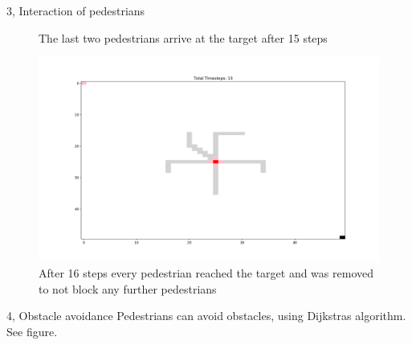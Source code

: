 \documentclass[10pt,a4paper]{article}
\begin{document}
\begin{task}{3, Interaction of pedestrians}
\begin{figure}
    \caption{The last two pedestrians arrive at the target after 15 steps}
    \label{fig:3_15}
\end{figure}
\begin{figure}
    \centering
    \includegraphics[width=\textwidth]{pictures/Figure_16.png}
    \caption{After 16 steps every pedestrian reached the target and was removed to not block any further pedestrians}
    \label{fig:3_16}
\end{figure}
\end{task}
\begin{task}{4, Obstacle avoidance}
Pedestrians can avoid obstacles, using Dijkstras algorithm. See figure.
\end{task}
\end{document}
